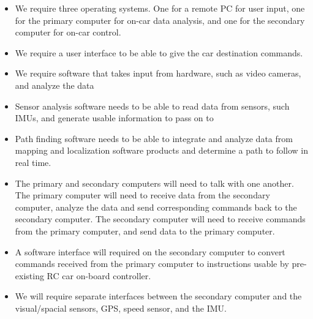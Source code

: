 \documentclass[compsoc,draftclsnofoot,onecolumn,10pt]{IEEEtran}
\begin{document}
\begin{itemize}
	
	\item We require three operating systems. One for a remote PC for user input, one
	for the primary computer for on-car data analysis, and one for the secondary
	computer for on-car control.
	
	\item We require a user interface to be able to give the car destination commands. 
	
	\item We require software that takes input from hardware, such as video cameras,
	and analyze the data 
	
	\item Sensor analysis software needs to be able to read data from sensors, such IMUs, and generate usable information to pass on to 
	
	\item Path finding software needs to be able to integrate and analyze data from mapping and localization software products and determine a path to follow in real time.
	
	\item The primary and secondary computers will need to talk with one another. The
	primary computer will need to receive data from the secondary computer,
	analyze the data and send corresponding commands back to the secondary
	computer. The secondary computer will need to receive commands from the
	primary computer, and send data to the primary computer.
	
	\item A software interface will required on the secondary computer to convert
	commands received from the primary computer to instructions usable by
	pre-existing RC car on-board controller.
	
	\item We will require separate interfaces between the secondary computer and the
	visual/spacial sensors, GPS, speed sensor, and the IMU. 
	
\end{itemize}
\end{document}
